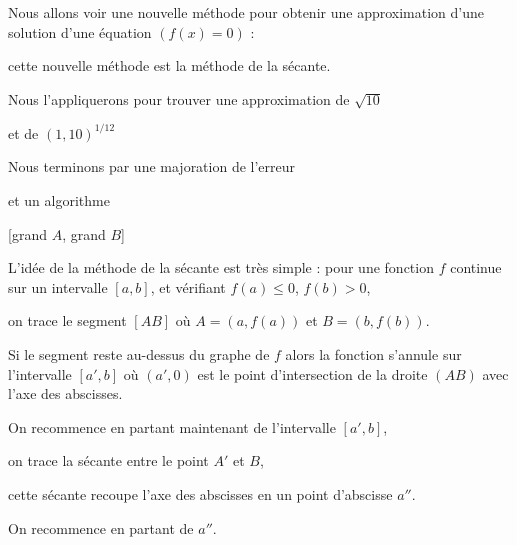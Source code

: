 







\debuttexte


\diapo

\change

Nous allons voir une nouvelle méthode pour obtenir une approximation d'une solution
d'une équation $(f(x)=0)$ :

\change

cette nouvelle méthode est la méthode de la sécante.

\change

Nous l'appliquerons pour trouver une approximation 
de $\sqrt{10}$

\change

et de $(1,10)^{1/12}$

\change

Nous terminons par une majoration de l'erreur 

\change

et un algorithme

\diapo

[grand $A$, grand $B$]

L'idée de la méthode de la sécante est très simple : pour une fonction $f$ 
continue sur un intervalle $[a,b]$, et vérifiant $f(a) \le 0$, $f(b) > 0$,

\change

on trace le segment $[AB]$ où $A=(a,f(a))$ 
et $B=(b,f(b))$. 


\change

Si le segment reste au-dessus du graphe de $f$ alors la fonction s'annule sur l'intervalle $[a',b]$ où 
$(a',0)$ est le point d'intersection de 
la droite $(AB)$ avec l'axe des abscisses. 


\change


On recommence en partant maintenant de l'intervalle $[a',b]$,


on trace la sécante entre le point $A'$ et $B$, 

\change

cette sécante recoupe l'axe des abscisses en un point d'abscisse $a''$.

\change

On recommence en partant de $a''$.


